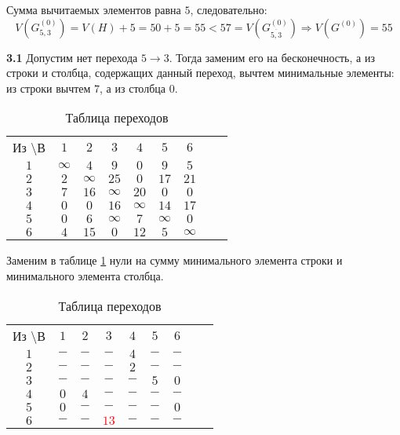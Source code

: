 Сумма вычитаемых элементов равна $5$, следовательно:
\begin{equation*}
V(G_{5,3}^{(0)}) = V(H) + 5 = 50 + 5 = 55 < 57 = V(G_{\overline{5,3}}^{(0)}) \Rightarrow V(G^{(0)}) = 55
\end{equation*}

\textbf{3.1} Допустим нет перехода $5 \rightarrow 3$. Тогда заменим его на бесконечность, а из строки и столбца, содержащих данный переход, вычтем минимальные элементы: из строки вычтем $7$, а из столбца $0$.

\begin{table}[H]
\begin{center}
	\def\tabcolsep{15pt}
	\caption{Таблица переходов}
	\label{tab:8}
	\begin{tabular}{|c||c|c|c|c|c|c|c|c|}
		\hline
		Из \textbackslash В & $1$ & $2$ & $3$ & $4$ & $5$ & $6$ \\
		\hhline{|=#=|=|=|=|=|=|}
		$1$ & $\infty$ & $4$ & $9$ & $0$ & $9$ & $5$ \\
		\hline
		$2$ & $2$ & $\infty$ & $25$ & $0$ & $17$ & $21$ \\
		\hline
		$3$ & $7$ & $16$ & $\infty$ & $20$ & $0$ & $0$ \\ 
		\hline
		$4$ & $0$ & $0$ & $16$ & $\infty$ & $14$ & $17$ \\
		\hline
		$5$ & $0$ & $6$ & $\infty$ & $7$ & $\infty$ & $0$ \\
		\hline
		$6$ & $4$ & $15$ & $0$ & $12$ & $5$ & $\infty$ \\ 
		\hline
	\end{tabular}
\end{center}
\end{table}

Заменим в таблице \ref{tab:8} нули на сумму минимального элемента строки и минимального элемента столбца.

\begin{table}[H]
\begin{center}
	\def\tabcolsep{15pt}
	\caption{Таблица переходов}
	\label{tab:9}
	\begin{tabular}{|c||c|c|c|c|c|c|c|c|}
		\hline
		Из \textbackslash В & $1$ & $2$ & $3$ & $4$ & $5$ & $6$ \\
		\hhline{|=#=|=|=|=|=|=|}
		$1$ & $-$ & $-$ & $-$ & $4$ & $-$ & $-$ \\
		\hline
		$2$ & $-$ & $-$ & $-$ & $2$ & $-$ & $-$ \\
		\hline
		$3$ & $-$ & $-$ & $-$ & $-$ & $5$ & $0$ \\ 
		\hline
		$4$ & $0$ & $4$ & $-$ & $-$ & $-$ & $-$ \\
		\hline
		$5$ & $0$ & $-$ & $-$ & $-$ & $-$ & $0$ \\
		\hline
		$6$ & $-$ & $-$ & \textcolor{red}{\boldmath$13$} & $-$ & $-$ & $-$ \\ 
		\hline
	\end{tabular}
\end{center}
\end{table}

